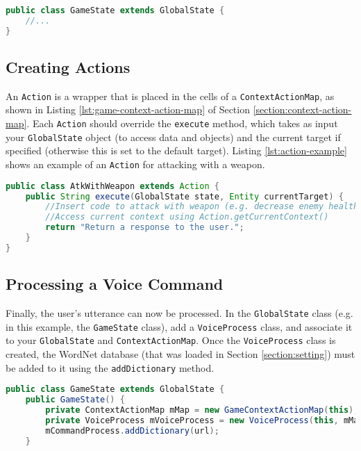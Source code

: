 \documentclass{article}
\begin{document}
\begin{lstlisting}[language=Java, label=lst:game-state]
public class GameState extends GlobalState {
	//...
}
\end{lstlisting}

\subsection{Creating Actions}
\label{section:actions}
An \texttt{Action} is a wrapper that is placed in the cells of a \texttt{ContextActionMap}, as shown in Listing \ref{lst:game-context-action-map} of Section \ref{section:context-action-map}. Each \texttt{Action} should override the \texttt{execute} method, which takes as input your \texttt{GlobalState} object (to access data and objects) and the current target if specified (otherwise this is set to the default target). Listing \ref{lst:action-example} shows an example of an \texttt{Action} for attacking with a weapon.

\begin{lstlisting}[language=Java, caption=Example of an Action, label={lst:action-example}]
public class AtkWithWeapon extends Action {
    public String execute(GlobalState state, Entity currentTarget) {
        //Insert code to attack with weapon (e.g. decrease enemy health)
        //Access current context using Action.getCurrentContext()
        return "Return a response to the user.";
    }
}
\end{lstlisting}

\subsection{Processing a Voice Command}

Finally, the user's utterance can now be processed. In the \texttt{GlobalState} class (e.g. in this example, the \texttt{GameState} class), add a \texttt{VoiceProcess} class, and associate it to your \texttt{GlobalState} and \texttt{ContextActionMap}. Once the \texttt{VoiceProcess} class is created, the WordNet database (that was loaded in Section \ref{section:setting}) must be added to it using the \texttt{addDictionary} method.

\begin{lstlisting}[language=Java, label={lst:voiceprocess}]
public class GameState extends GlobalState {
    public GameState() {
        private ContextActionMap mMap = new GameContextActionMap(this);
        private VoiceProcess mVoiceProcess = new VoiceProcess(this, mMap);
        mCommandProcess.addDictionary(url);
    }
\end{lstlisting}
\end{document}
